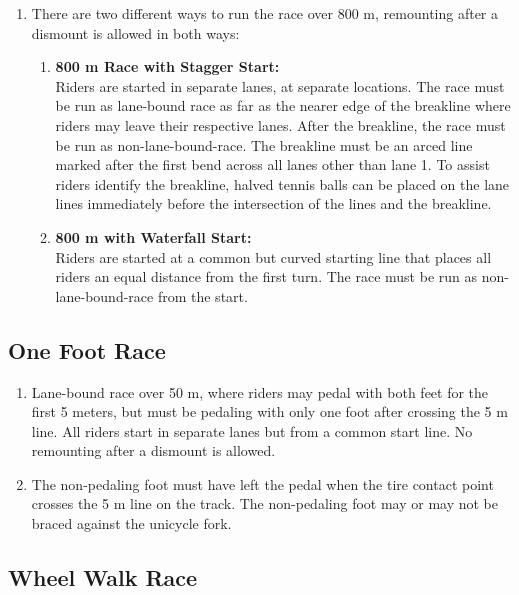 \begin{enumerate}[leftmargin=1.5em,labelsep=*]
	\item There are two different ways to run the race over 800 m, remounting after a dismount is allowed in both ways:
	
	\begin{enumerate}[label*=\arabic*,leftmargin=1.5em,labelsep=*]
		\item \textbf{800 m Race with Stagger Start:}\\
		Riders are started in separate lanes, at separate locations.
		The race must be run as lane-bound race as far as the nearer edge of the breakline where riders may leave 
    their respective lanes. After the breakline, the race must be run as non-lane-bound-race.
		The breakline must be an arced line marked after the first bend across all lanes other than lane 1.
		To assist riders identify the breakline, halved tennis balls can be placed on the lane lines immediately before the 
    intersection of the lines and the breakline.
		
		\item \textbf{800 m with Waterfall Start:}\\
		Riders are started at a common but curved starting line that places all riders an equal distance from the first turn.
		The race must be run as non-lane-bound-race from the start.
	\end{enumerate}
\end{enumerate}

\subsection{One Foot Race}

\begin{enumerate}[leftmargin=1.5em,labelsep=*]
	\item Lane-bound race over 50 m, where riders may pedal with both feet for the first 5 meters, 
  but must be pedaling with only one foot after crossing the 5 m line.
	All riders start in separate lanes but from a common start line. No remounting after a dismount is allowed.
	
	\item The non-pedaling foot must have left the pedal when the tire contact point crosses the 5 m line on the track.
	The non-pedaling foot may or may not be braced against the unicycle fork.
\end{enumerate}

\subsection{Wheel Walk Race}


